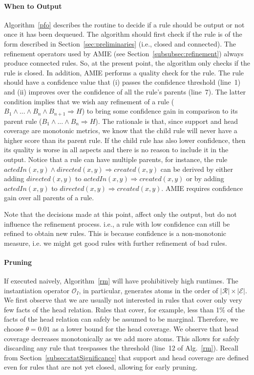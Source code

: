 \paragraph{When to Output}\label{subsubsec:whenToOutput}
Algorithm~\ref{pfo} describes the routine to decide if a rule should be output or not once it has been dequeued.
The algorithm should first check if the rule is of the form described in Section~\ref{sec:preliminaries} (i.e., closed and connected).
The refinement operators used by AMIE (see Section~\ref{subsubsec:refinement}) always produce connected rules. So, at the present point, the algorithm only checks if the rule is closed.
In addition, AMIE performs a quality check for the rule. The rule should have a confidence value that (i) passes the confidence threshold (line~1)
and (ii) improves over the confidence of all the rule's parents (line~7).
The latter condition implies that we wish any refinement of a rule ( $B_1 \wedge ... \wedge B_n \wedge B_{n+1} \Rightarrow H$) to bring some confidence gain in comparison to its parent rule
($B_1 \wedge ... \wedge B_n \Rightarrow H$). The rationale is that, since support and head coverage are monotonic metrics, we know that the child rule will never have a higher score than its parent rule. 
If the child rule has also lower confidence, then its quality is worse in all aspects and there is no reason to include it in the output.
Notice that a rule can have multiple parents, for instance, the rule $actedIn(x,y) \wedge directed(x,y) \Rightarrow created(x,y)$
can be derived by either adding $directed(x,y)$ to  $actedIn(x,y) \Rightarrow created(x,y)$ or by adding $actedIn(x,y)$ to
$directed(x,y) \Rightarrow created(x,y)$. AMIE requires confidence gain over all parents of a rule.

Note that the decisions made at this point, affect only the output, but do not influence the refinement process. i.e., a rule with low confidence can still be refined to obtain new rules.
This is because confidence is a non-monotonic measure, i.e. we might get good rules with further refinement of bad rules.




\paragraph{Pruning}
If executed naively, Algorithm~\ref{rm} will have prohibitively high runtimes.
The instantiation operator $\mathcal{O}_I$, in particular, generates atoms in the order of $|\mathcal{R}| \times |\mathcal{E}|$.
We first observe that we are usually not interested in rules that cover only very few facts of the head relation.
Rules that cover, for example, less than 1\% of the facts of the head relation can safely be assumed to be marginal.
Therefore, we choose $\theta=0.01$ as a lower bound for the head coverage. We observe that head coverage decreases monotonically as we add more atoms.
This allows for safely discarding any rule that trespasses the threshold (line~12 of Alg.~\ref{rm}).
Recall from Section~\ref{subsec:statSignificance} that support and head coverage are defined even for rules that are not yet closed, allowing for early pruning.

